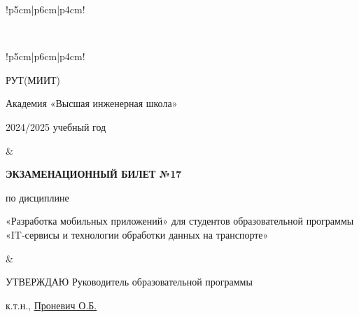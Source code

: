 \documentclass[a4paper]{article}
\begin{document}
\begin{tabular}{!{\vrule width 2pt}p{5cm}|p{6cm}|p{4cm}!{\vrule width 2pt}}
{\begin{minipage}{16cm}
\vspace{0.2cm}
    
\end{minipage}
}
\\
\end{tabular}

\newpage


\begin{tabular}{!{\vrule width 2pt}p{5cm}|p{6cm}|p{4cm}!{\vrule width 2pt}}

    {\centering 
    \fontsize{14pt}{16pt}\selectfont
    РУТ(МИИТ)

\vspace{14pt}

Академия «Высшая инженерная школа»

\vspace{14pt}

2024/2025 учебный год

    }
&
{
    \centering
\fontsize{14pt}{16pt}\selectfont

\textbf{ЭКЗАМЕНАЦИОННЫЙ
БИЛЕТ №17}


по дисциплине 

«Разработка мобильных приложений» 
\fontsize{12pt}{14pt}\selectfont
для студентов образовательной программы «IT-сервисы и технологии обработки данных на транспорте»

}
&
{
\centering
\fontsize{14pt}{16pt}\selectfont

УТВЕРЖДАЮ
Руководитель образовательной программы

\vspace{1cm}

\fontsize{12pt}{14pt}\selectfont
\underline{\hspace{3cm}}

к.т.н., \underline{Проневич О.Б.}

}
\\
\hline
{}
\end{tabular}
\end{document}
